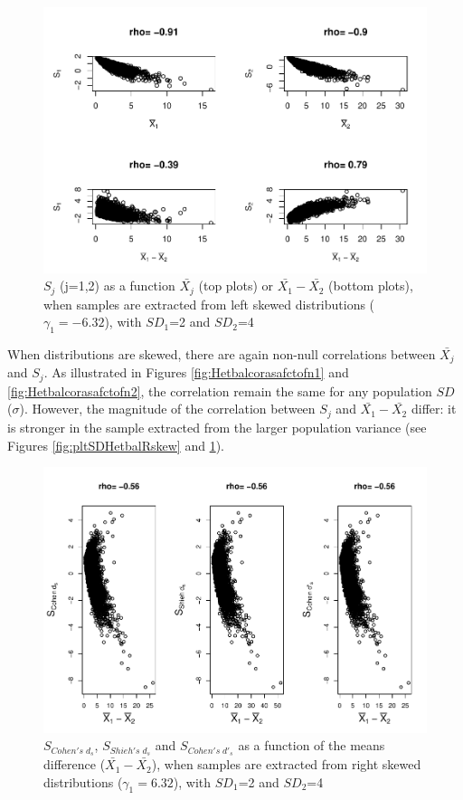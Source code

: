 \documentclass[
  man]{apa6}
\begin{document}
\begin{figure}
\centering
\includegraphics{Correlation_files/figure-latex/pltSDHetbalLskew-1.pdf}
\caption{\label{fig:pltSDHetbalLskew}\(S_j\) (j=1,2) as a function \(\bar{X_j}\) (top plots) or \(\bar{X_1}-\bar{X_2}\) (bottom plots), when samples are extracted from left skewed distributions (\(\gamma_1 = -6.32\)), with \(SD_1\)=2 and \(SD_2\)=4}
\end{figure}

When distributions are skewed, there are again non-null correlations between \(\bar{X_j}\) and \(S_j\). As illustrated in Figures \ref{fig:Hetbalcorasafctofn1} and \ref{fig:Hetbalcorasafctofn2}, the correlation remain the same for any population \(SD\) (\(\sigma\)). However, the magnitude of the correlation between \(S_j\) and \(\bar{X_1}-\bar{X_2}\) differ: it is stronger in the sample extracted from the larger population variance (see Figures \ref{fig:pltSDHetbalRskew} and \ref{fig:pltSDHetbalLskew}).

\begin{figure}
\centering
\includegraphics{Correlation_files/figure-latex/pltStdzrHetbalRskew-1.pdf}
\caption{\label{fig:pltStdzrHetbalRskew}\(S_{Cohen's \; d_s}\), \(S_{Shieh's \; d_s}\) and \(S_{Cohen's \; d'_s}\) as a function of the means difference (\(\bar{X_1}-\bar{X_2}\)), when samples are extracted from right skewed distributions (\(\gamma_1 = 6.32\)), with \(SD_1\)=2 and \(SD_2\)=4}
\end{figure}
\end{document}
